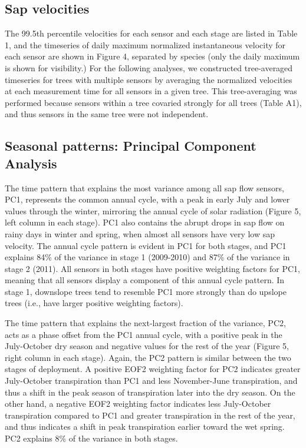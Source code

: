\subsection{Sap velocities}
The 99.5th percentile velocities for each sensor and each stage are listed in Table 1, and the timeseries of daily maximum normalized instantaneous velocity for each sensor are shown in Figure 4, separated by species (only the daily maximum is shown for visibility.)  For the following analyses, we constructed tree-averaged timeseries for trees with multiple sensors by averaging the normalized velocities at each measurement time for all sensors in a given tree.  This tree-averaging was performed because sensors within a tree covaried strongly for all trees (Table A1), and thus sensors in the same tree were not independent.

\subsection{Seasonal patterns: Principal Component Analysis}
The time pattern that explains the most variance among all sap flow sensors, PC1, represents the common annual cycle, with a peak in early July and lower values through the winter, mirroring the annual cycle of solar radiation (Figure 5, left column in each stage).  PC1 also contains the abrupt drops in sap flow on rainy days in winter and spring, when almost all sensors have very low sap velocity.  The annual cycle pattern is evident in PC1 for both stages, and PC1 explains 84\% of the variance in stage 1 (2009-2010) and 87\% of the variance in stage 2 (2011).  All sensors in both stages have positive weighting factors for PC1, meaning that all sensors display a component of this annual cycle pattern.  In stage 1, downslope trees tend to resemble PC1 more strongly than do upslope trees (i.e., have larger positive weighting factors).

The time pattern that explains the next-largest fraction of the variance, PC2, acts as a phase offset from the PC1 annual cycle, with a positive peak in the July-October dry season and negative values for the rest of the year (Figure 5, right column in each stage).  Again, the PC2 pattern is similar between the two stages of deployment.  A positive EOF2 weighting factor for PC2 indicates greater July-October transpiration than PC1 and less November-June transpiration, and thus a shift in the peak season of transpiration later into the dry season.  On the other hand, a negative EOF2 weighting factor indicates less July-October transpiration compared to PC1 and greater transpiration in the rest of the year, and thus indicates a shift in peak transpiration earlier toward the wet spring.  PC2 explains 8\% of the variance in both stages.

